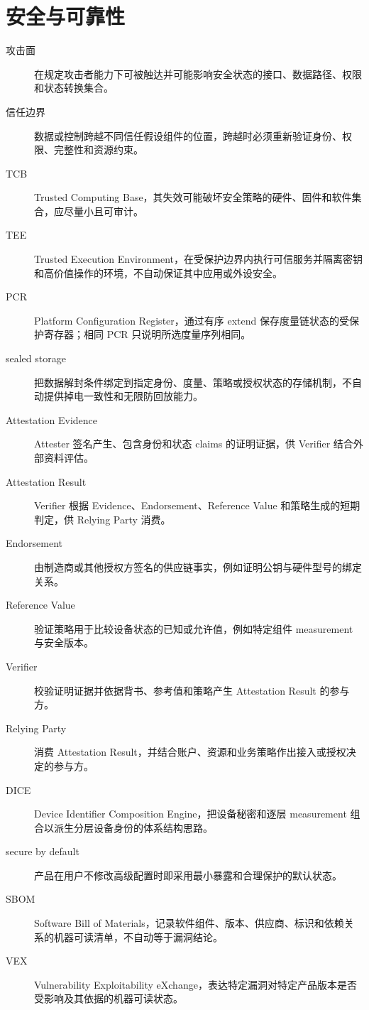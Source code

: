 \section{安全与可靠性}

\begin{description}
  \item[攻击面] 在规定攻击者能力下可被触达并可能影响安全状态的接口、数据路径、权限和状态转换集合。
  \item[信任边界] 数据或控制跨越不同信任假设组件的位置，跨越时必须重新验证身份、权限、完整性和资源约束。
  \item[TCB] Trusted Computing Base，其失效可能破坏安全策略的硬件、固件和软件集合，应尽量小且可审计。
  \item[TEE] Trusted Execution Environment，在受保护边界内执行可信服务并隔离密钥和高价值操作的环境，不自动保证其中应用或外设安全。
  \item[PCR] Platform Configuration Register，通过有序 extend 保存度量链状态的受保护寄存器；相同 PCR 只说明所选度量序列相同。
  \item[sealed storage] 把数据解封条件绑定到指定身份、度量、策略或授权状态的存储机制，不自动提供掉电一致性和无限防回放能力。
  \item[Attestation Evidence] Attester 签名产生、包含身份和状态 claims 的证明证据，供 Verifier 结合外部资料评估。
  \item[Attestation Result] Verifier 根据 Evidence、Endorsement、Reference Value 和策略生成的短期判定，供 Relying Party 消费。
  \item[Endorsement] 由制造商或其他授权方签名的供应链事实，例如证明公钥与硬件型号的绑定关系。
  \item[Reference Value] 验证策略用于比较设备状态的已知或允许值，例如特定组件 measurement 与安全版本。
  \item[Verifier] 校验证明证据并依据背书、参考值和策略产生 Attestation Result 的参与方。
  \item[Relying Party] 消费 Attestation Result，并结合账户、资源和业务策略作出接入或授权决定的参与方。
  \item[DICE] Device Identifier Composition Engine，把设备秘密和逐层 measurement 组合以派生分层设备身份的体系结构思路。
  \item[secure by default] 产品在用户不修改高级配置时即采用最小暴露和合理保护的默认状态。
  \item[SBOM] Software Bill of Materials，记录软件组件、版本、供应商、标识和依赖关系的机器可读清单，不自动等于漏洞结论。
  \item[VEX] Vulnerability Exploitability eXchange，表达特定漏洞对特定产品版本是否受影响及其依据的机器可读状态。

\end{description}
